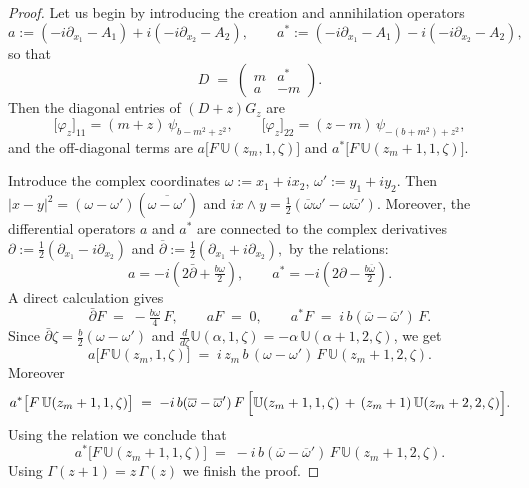 \documentclass[11pt,a4paper,reqno,oneside]{amsproc}
\numberwithin{equation}{section}
\begin{document}
\begin{proof}
Let us begin by introducing the  creation and annihilation operators 
\begin{equation*}%
a := (-i \partial_{x_1} -A_1) + i (-i \partial_{x_2} -A_2) , \qquad a^* := (-i \partial_{x_1} -A_1) - i (-i \partial_{x_2} -A_2), 
\end{equation*}
so that
\[
D \;=\; \begin{pmatrix} m & a^* \\ a& -m \end{pmatrix}.
\]
Then the  diagonal entries of $(D+z)G_z$ are 
\[
\bigl[\varphi_z\bigr]_{11} = (m+z)\,\psi_{b-m^2+z^2}, \qquad
\bigl[\varphi_z\bigr]_{22} = (z-m)\,\psi_{-(b+m^2)+z^2},
\]
and  the off-diagonal terms are
 $a\bigl[F\,\mathbb{U}(z_m,1,\zeta)\bigr]$ and $a^*\bigl[F\,\mathbb{U}(z_m+1,1,\zeta)\bigr]$.

Introduce the complex coordinates $\omega:=x_1+ix_2$, $\omega':=y_1+iy_2$. Then $|x-y|^2=(\omega-\omega')(\overline{\omega-\omega'})$ and  $ix\wedge y = \tfrac{1}{2}(\overline\omega\omega'-\omega\overline\omega')$.  Moreover,  the differential operators $a$ and $a^*$ are connected to the complex derivatives 
$
\partial:= \frac12(\partial_{x_1} - i \partial_{x_2})$ and $ \overline{\partial}:= \frac12(\partial_{x_1} + i \partial_{x_2}),
$
by the relations: 
\begin{equation}\label{a_partial}
a =-i\left(2\bar\partial +\tfrac{b\omega}{2}\right), \qquad
a^*= -i(2\partial-\tfrac{b\overline\omega}{2}).
\end{equation}
A direct calculation gives
\begin{equation*}
\bar\partial F \;=\; -\tfrac{b\omega}{4}\,F, \qquad
a F \;=\; 0, \qquad
a^*F \;=\; i\,b(\overline\omega-\overline\omega')\,F.
\end{equation*}
Since $\bar\partial\zeta=\tfrac{b}{2}(\omega-\omega')$ and $\frac{d}{d\zeta}\mathbb{U}(\alpha,1,\zeta) = -\alpha\,\mathbb{U}(\alpha+1,2,\zeta)$, we get
\begin{equation*}%
a\bigl[F\,\mathbb{U}(z_m,1,\zeta)\bigr] \;=\; i\,z_m\,b\,(\omega-\omega')\,F\,\mathbb{U}(z_m+1,2,\zeta).
\end{equation*}
Moreover
\[
a^*\bigl[F\,\mathbb{U}(z_m+1,1,\zeta)\bigr] \;=\; -i\,b(\overline\omega-\overline\omega')\,F\,\Bigl[\mathbb{U}(z_m+1,1,\zeta) \,+\, (z_m+1)\,\mathbb{U}(z_m+2,2,\zeta)\Bigr].
\]
Using the relation \cite[(13.3.9)]{Olver} we conclude  that 
\begin{equation*}%
a^*\bigl[F\,\mathbb{U}(z_m+1,1,\zeta)\bigr] \;=\; -i\,b(\overline\omega-\overline\omega')\,F\,\mathbb{U}(z_m+1,2,\zeta).
\end{equation*}
Using $\Gamma(z+1)=z\,\Gamma(z)$ we finish the proof.
\end{proof}
\end{document}
